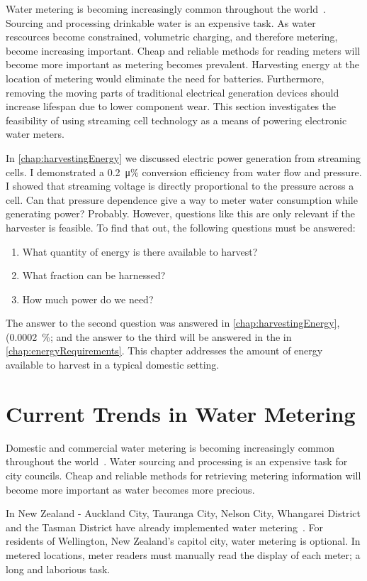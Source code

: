 
Water metering is becoming increasingly common throughout the world~\cite{Chang2012}.
Sourcing and processing drinkable water is an expensive task.
As water rescources become constrained, volumetric charging, and therefore metering, become increasing important.
Cheap and reliable methods for reading meters will become more important as metering becomes prevalent.
Harvesting energy at the location of metering would eliminate the need for batteries.
Furthermore, removing the moving parts of traditional electrical generation devices should increase lifespan due to lower component wear.
This section investigates the feasibility of using streaming cell technology as a means of powering electronic water meters.

In \cref{chap:harvestingEnergy} we discussed electric power generation from streaming cells.
I demonstrated a \SI{0.2}{\micro\percent} conversion efficiency from water flow and pressure.
I showed that streaming voltage is directly proportional to the pressure across a cell.
Can that pressure dependence give a way to meter water consumption while generating power? Probably.
However, questions like this are only relevant if the harvester is feasible.
To find that out, the following questions must be answered:
\begin{enumerate}
  \item What quantity of energy is there available to harvest?
  \item What fraction can be harnessed?
  \item How much power do we need?
\end{enumerate}
The answer to the second question was answered in \cref{chap:harvestingEnergy}, (\SI{0.0002}{\percent}; and the answer to the third will be answered in the in \cref{chap:energyRequirements}.
This chapter addresses the amount of energy available to harvest in a typical domestic setting.


\section{Current Trends in Water Metering}
  Domestic and commercial water metering is becoming increasingly common throughout the world~\cite{Chang2012}.
  Water sourcing and processing is an expensive task for city councils.
  Cheap and reliable methods for retrieving metering information will become more important as water becomes more precious.

  In New Zealand - Auckland City, Tauranga City, Nelson City, Whangarei District and the Tasman District have already implemented water metering~\cite{WaterNewZealand2011}.
  For residents of Wellington, New Zealand's capitol city, water metering is optional.
  In metered locations, meter readers must manually read the display of each meter; a long and laborious task.
  
